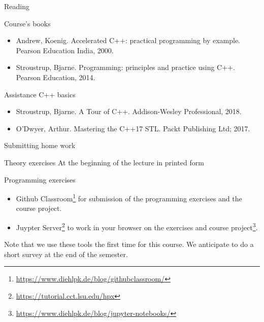 \documentclass[\classoption]{beamer}
\begin{document}
\begin{frame}{Reading}

\begin{block}{Course's books}
\begin{itemize}
\item Andrew, Koenig. Accelerated C++: practical programming by example. Pearson Education India, 2000.
\item Stroustrup, Bjarne. Programming: principles and practice using C++. Pearson Education, 2014.
\end{itemize}
\end{block}

\begin{block}{Assistance C++ basics }
\begin{itemize}
\item Stroustrup, Bjarne. A Tour of C++. Addison-Wesley Professional, 2018.
\item O'Dwyer, Arthur. Mastering the C++17 STL. Packt Publishing Ltd; 2017.
\end{itemize}
\end{block}
\end{frame}

\begin{frame}{Submitting home work}

\begin{block}{Theory exercises}
At the beginning of the lecture in printed form
\end{block}

\begin{block}{Programming exercises}
\begin{itemize}
\item Github Classroom\footnote{\tiny\url{https://www.diehlpk.de/blog/githubclassroom/}} for submission of the programming exercises and the course project.
\item Juypter Server\footnote{\tiny\url{https://tutorial.cct.lsu.edu/hpx}} to work in your browser on the exercises and course project\footnote{\tiny\url{https://www.diehlpk.de/blog/jupyter-notebooks/}}.
\end{itemize}
\end{block}
Note that we use these tools the first time for this course. We anticipate to do a short survey at the end of the semester.
\end{frame}
\end{document}
